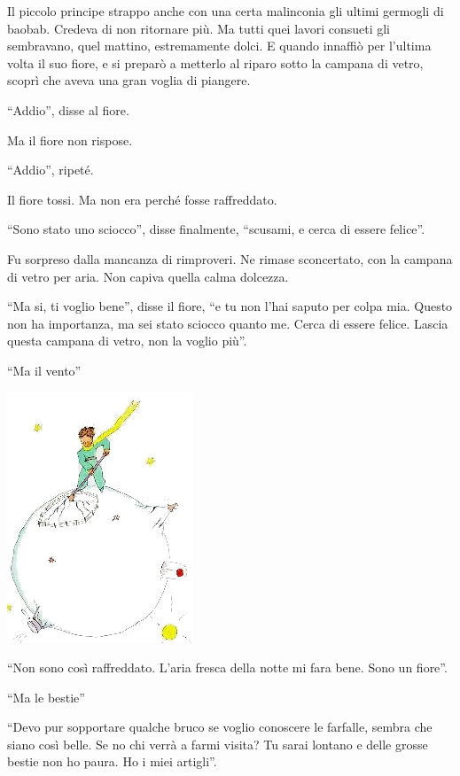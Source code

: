 \documentclass[11pt]{scrbook}
\begin{document}
Il piccolo principe strappo anche con una certa malinconia gli ultimi germogli di baobab. Credeva di non ritornare più. Ma tutti quei lavori consueti gli sembravano, quel mattino, estremamente dolci. E quando innaffiò per l'ultima volta il suo fiore, e si preparò a metterlo al riparo sotto la campana di vetro, scoprì che aveva una gran voglia di piangere.

``Addio'', disse al fiore.

Ma il fiore non rispose.

``Addio'', ripeté.

Il fiore tossi. Ma non era perché fosse raffreddato.

``Sono stato uno sciocco'', disse finalmente, ``scusami, e cerca di essere felice''.

Fu sorpreso dalla mancanza di rimproveri. Ne rimase sconcertato, con la campana di vetro per aria. Non capiva quella calma dolcezza.

``Ma si, ti voglio bene'', disse il fiore, ``e tu non l'hai saputo per colpa mia. Questo non ha importanza, ma sei stato sciocco quanto me. Cerca di essere felice. Lascia questa campana di vetro, non la voglio più''.

``Ma il vento''

\begin{center}
\includegraphics{img/9a}
\end{center}

``Non sono così raffreddato. L'aria fresca della notte mi fara bene. Sono un fiore''.

``Ma le bestie''

``Devo pur sopportare qualche bruco se voglio conoscere le farfalle, sembra che siano così belle. Se no chi verrà a farmi visita? Tu sarai lontano e delle grosse bestie non ho paura. Ho i miei artigli''.
\end{document}
